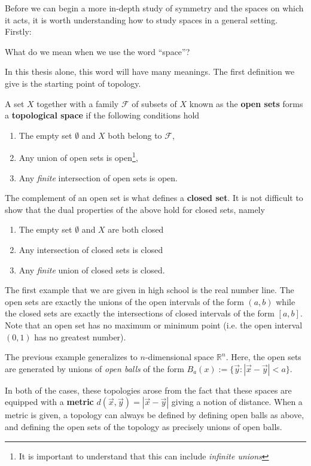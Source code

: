 	Before we can begin a more in-depth study of symmetry and the spaces on which it acts, it is worth understanding how to study spaces in a general setting. Firstly:
	\begin{ques}
		What do we mean when we use the word ``space''?
	\end{ques}
	In this thesis alone, this word will have many meanings. The first definition we give is the starting point of topology.
	\begin{defn}
		A set $X$ together with a family $\mathcal F$ of subsets of $X$ known as the \textbf{open sets} forms a \textbf{topological space} if the following conditions hold
		\begin{enumerate}
			\item The empty set $\emptyset$ and $X$ both belong to $\mathcal F$,
			\item Any union of open sets is open\footnote{It is important to understand that this can include \emph{infinite unions}},
			\item Any \emph{finite} intersection of open sets is open.
			
		\end{enumerate}
	\end{defn}
	The complement of an open set is what defines a \textbf{closed set}. It is not difficult to show that the dual properties of the above hold for closed sets, namely
	\begin{enumerate}
		\item The empty set $\emptyset$ and $X$ are both closed
		\item Any intersection of closed sets is closed
		\item Any \emph{finite} union of closed sets is closed.
	\end{enumerate}
	\begin{eg}
		The first example that we are given in high school is the real number line. The open sets are exactly the unions of the open intervals of the form $(a, b)$ while the closed sets are exactly the intersections of closed intervals of the form $[a, b]$. Note that an open set has no maximum or minimum point (i.e. the open interval $(0, 1)$ has no greatest number).
	\end{eg}
	\begin{eg}
		The previous example generalizes to $n$-dimensional space $\mathbb R^n$. Here, the open sets are generated by unions of \emph{open balls} of the form $B_a(x) := \{ \vec y : |\vec x - \vec y| < a \}$.
		
		In both of the cases, these topologies arose from the fact that these spaces are equipped with a \textbf{metric} $d(\vec x, \vec y) = |\vec x-\vec y|$ giving a notion of distance. When a metric is given, a topology can always be defined by defining open balls as above, and defining the open sets of the topology as precisely unions of open balls.
	\end{eg}
